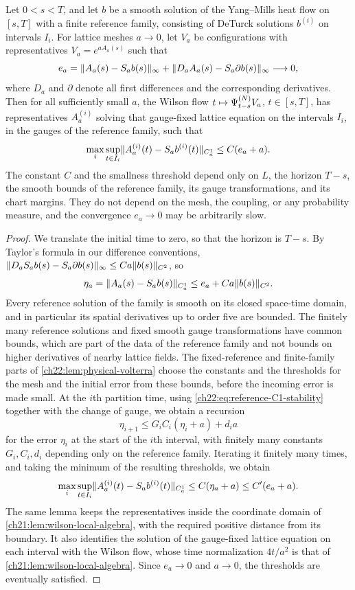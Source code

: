 \begin{lemma}\label{ch26:lem:continuation-from-handoff}
Let $0<s<T$, and let $b$ be a smooth solution of the Yang--Mills heat flow on $[s,T]$ with a finite reference family, consisting of DeTurck solutions $b^{(i)}$ on intervals $I_i$. For lattice meshes $a\to0$, let $V_a$ be configurations with representatives $V_a=e^{aA_a(s)}$ such that
\[
 e_a=\lVert A_a(s)-S_ab(s)\rVert_\infty+\lVert D_aA_a(s)-S_a\partial b(s)\rVert_\infty\longrightarrow0,
\]
where $D_a$ and $\partial$ denote all first differences and the corresponding derivatives. Then for all sufficiently small $a$, the Wilson flow $t\mapsto\Psi^{(N)}_{t-s}V_a$, $t\in[s,T]$, has representatives $A_a^{(i)}$ solving that gauge-fixed lattice equation on the intervals $I_i$, in the gauges of the reference family, such that
\[
 \max_i\sup_{t\in I_i}\lVert A_a^{(i)}(t)-S_ab^{(i)}(t)\rVert_{C_a^1}\le C(e_a+a).
\]
The constant $C$ and the smallness threshold depend only on $L$, the horizon $T-s$, the smooth bounds of the reference family, its gauge transformations, and its chart margins. They do not depend on the mesh, the coupling, or any probability measure, and the convergence $e_a\to0$ may be arbitrarily slow.
\end{lemma}

\begin{proof}
We translate the initial time to zero, so that the horizon is $T-s$. By Taylor's formula in our difference conventions, $\lVert D_aS_ab(s)-S_a\partial b(s)\rVert_\infty\le Ca\lVert b(s)\rVert_{C^2}$, so
\[
 \eta_a=\lVert A_a(s)-S_ab(s)\rVert_{C_a^1}\le e_a+Ca\lVert b(s)\rVert_{C^2}.
\]
Every reference solution of the family is smooth on its closed space-time domain, and in particular its spatial derivatives up to order five are bounded. The finitely many reference solutions and fixed smooth gauge transformations have common bounds, which are part of the data of the reference family and not bounds on higher derivatives of nearby lattice fields. The fixed-reference and finite-family parts of \cref{ch22:lem:physical-volterra} choose the constants and the thresholds for the mesh and the initial error from these bounds, before the incoming error is made small. At the $i$th partition time, using \eqref{ch22:eq:reference-C1-stability} together with the change of gauge, we obtain a recursion
\[
 \eta_{i+1}\le G_iC_i(\eta_i+a)+d_ia
\]
for the error $\eta_i$ at the start of the $i$th interval, with finitely many constants $G_i,C_i,d_i$ depending only on the reference family. Iterating it finitely many times, and taking the minimum of the resulting thresholds, we obtain
\[
 \max_i\sup_{t\in I_i}\lVert A_a^{(i)}(t)-S_ab^{(i)}(t)\rVert_{C_a^1}\le C(\eta_a+a)\le C'(e_a+a).
\]
The same lemma keeps the representatives inside the coordinate domain of \cref{ch21:lem:wilson-local-algebra}, with the required positive distance from its boundary. It also identifies the solution of the gauge-fixed lattice equation on each interval with the Wilson flow, whose time normalization $4t/a^2$ is that of \cref{ch21:lem:wilson-local-algebra}. Since $e_a\to0$ and $a\to0$, the thresholds are eventually satisfied.
\end{proof}

